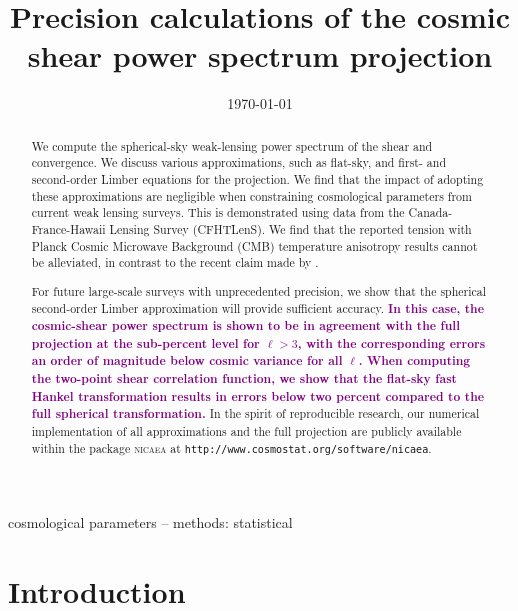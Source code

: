 \documentclass[fleqn,usenatbib]{mnras} %
\title[Precision calculations of the cosmic shear projection]{Precision calculations of the cosmic shear power spectrum
projection}
\date{\today}
\newcommand{\ch}[1]{\textcolor{purple}{\textbf{#1}}}
\begin{document}
\setlength{\voffset}{-12mm}

\label{firstpage}


\maketitle
\begin{abstract}

We compute the spherical-sky weak-lensing power spectrum of the shear and
convergence. We discuss various approximations, such as flat-sky, and first- and
second-order Limber equations for the projection. We find that the impact of
adopting these approximations are negligible when constraining cosmological
parameters from current weak lensing surveys.
%
This is demonstrated using data from the Canada-France-Hawaii Lensing Survey
(CFHTLenS). We find that the reported tension with Planck Cosmic Microwave
Background (CMB) temperature anisotropy results cannot be alleviated, in
contrast to the recent claim made by \citet{2016arXiv161104954K}. 

For future
large-scale surveys with unprecedented precision, we show that the spherical
second-order Limber approximation will provide sufficient accuracy. \ch{In this case, the
cosmic-shear power spectrum is shown to be in agreement with the full projection at the
sub-percent level for $\ell > 3$, with the corresponding errors an order of
magnitude below cosmic variance for all $\ell$.
When computing the two-point shear correlation function, we show that the flat-sky fast Hankel 
transformation results in errors below two percent compared to the full spherical transformation.}
%
In the spirit of reproducible research, our numerical implementation of all
approximations and the full projection are publicly available within the
package \textsc{nicaea} at \texttt{http://www.cosmostat.org/software/nicaea}.

\end{abstract}

\begin{keywords}
cosmological parameters -- methods: statistical
\end{keywords}



\section{Introduction}
\label{sec:intro}
\end{document}
